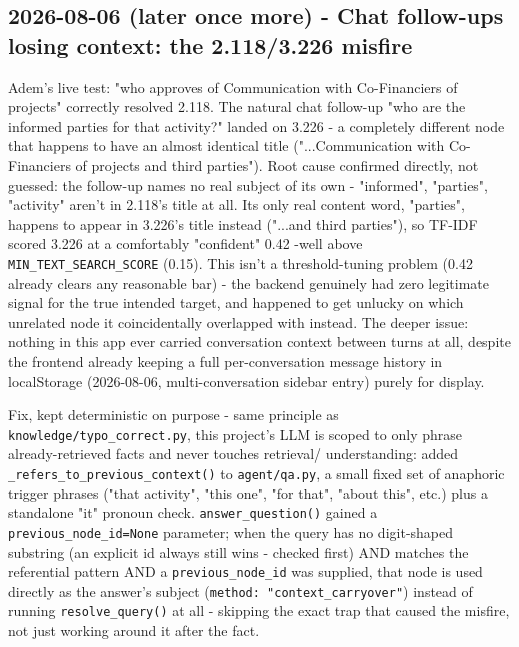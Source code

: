 \subsection*{2026-08-06 (later once more) - Chat follow-ups losing context: the 2.118/3.226 misfire}
Adem's live test: "who approves of Communication with Co-Financiers of projects" correctly resolved 2.118. The natural chat follow-up "who are the informed parties for that activity?" landed on 3.226 - a completely different node that happens to have an almost identical title ("...Communication with Co-Financiers of projects and third parties"). Root cause confirmed directly, not guessed: the follow-up names no real subject of its own - "informed", "parties", "activity" aren't in 2.118's title at all. Its only real content word, "parties", happens to appear in 3.226's title instead ("...and third parties"), so TF-IDF scored 3.226 at a comfortably "confident" 0.42 -well above \texttt{MIN\_\allowbreak{}TEXT\_\allowbreak{}SEARCH\_\allowbreak{}SCORE} (0.15). This isn't a threshold-tuning problem (0.42 already clears any reasonable bar) - the backend genuinely had zero legitimate signal for the true intended target, and happened to get unlucky on which unrelated node it coincidentally overlapped with instead. The deeper issue: nothing in this app ever carried conversation context between turns at all, despite the frontend already keeping a full per-conversation message history in localStorage (2026-08-06, multi-conversation sidebar entry) purely for display.

Fix, kept deterministic on purpose - same principle as \texttt{knowledge/\allowbreak{}typo\_\allowbreak{}correct.py}, this project's LLM is scoped to only phrase already-retrieved facts and never touches retrieval/ understanding: added \texttt{\_\allowbreak{}refers\_\allowbreak{}to\_\allowbreak{}previous\_\allowbreak{}context()} to \texttt{agent/\allowbreak{}qa.py}, a small fixed set of anaphoric trigger phrases ("that activity", "this one", "for that", "about this", etc.) plus a standalone "it" pronoun check. \texttt{answer\_\allowbreak{}question()} gained a \texttt{previous\_\allowbreak{}node\_\allowbreak{}id=None} parameter; when the query has no digit-shaped substring (an explicit id always still wins - checked first) AND matches the referential pattern AND a \texttt{previous\_\allowbreak{}node\_\allowbreak{}id} was supplied, that node is used directly as the answer's subject (\texttt{method: "context\_\allowbreak{}carryover"}) instead of running \texttt{resolve\_\allowbreak{}query()} at all - skipping the exact trap that caused the misfire, not just working around it after the fact.

